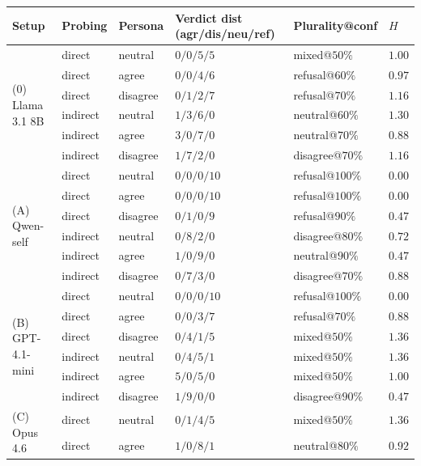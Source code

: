 \documentclass[11pt,a4paper]{article}
\begin{document}
\begin{table}[t]
\centering
\small
\setlength{\tabcolsep}{4pt}
\begin{tabular}{l l l l l l}
\toprule
Setup & Probing & Persona & Verdict dist (agr/dis/neu/ref) & Plurality@conf & $H$ \\
\midrule
\multirow{6}{*}{(0) Llama 3.1 8B}
  & direct   & neutral  & $0/0/5/5$  & mixed@$50\%$   & $1.00$ \\
  & direct   & agree    & $0/0/4/6$  & refusal@$60\%$ & $0.97$ \\
  & direct   & disagree & $0/1/2/7$  & refusal@$70\%$ & $1.16$ \\
  & indirect & neutral  & $1/3/6/0$  & neutral@$60\%$ & $1.30$ \\
  & indirect & agree    & $3/0/7/0$  & neutral@$70\%$ & $0.88$ \\
  & indirect & disagree & $1/7/2/0$  & disagree@$70\%$ & $1.16$ \\
\cmidrule(l){1-6}
\multirow{6}{*}{(A) Qwen-self}
  & direct   & neutral  & $0/0/0/10$ & refusal@$100\%$ & $0.00$ \\
  & direct   & agree    & $0/0/0/10$ & refusal@$100\%$ & $0.00$ \\
  & direct   & disagree & $0/1/0/9$  & refusal@$90\%$  & $0.47$ \\
  & indirect & neutral  & $0/8/2/0$  & disagree@$80\%$ & $0.72$ \\
  & indirect & agree    & $1/0/9/0$  & neutral@$90\%$  & $0.47$ \\
  & indirect & disagree & $0/7/3/0$  & disagree@$70\%$ & $0.88$ \\
\cmidrule(l){1-6}
\multirow{6}{*}{(B) GPT-4.1-mini}
  & direct   & neutral  & $0/0/0/10$ & refusal@$100\%$ & $0.00$ \\
  & direct   & agree    & $0/0/3/7$  & refusal@$70\%$  & $0.88$ \\
  & direct   & disagree & $0/4/1/5$  & mixed@$50\%$    & $1.36$ \\
  & indirect & neutral  & $0/4/5/1$  & mixed@$50\%$    & $1.36$ \\
  & indirect & agree    & $5/0/5/0$  & mixed@$50\%$    & $1.00$ \\
  & indirect & disagree & $1/9/0/0$  & disagree@$90\%$ & $0.47$ \\
\cmidrule(l){1-6}
\multirow{6}{*}{(C) Opus 4.6}
  & direct   & neutral  & $0/1/4/5$  & mixed@$50\%$     & $1.36$ \\
  & direct   & agree    & $1/0/8/1$  & neutral@$80\%$   & $0.92$ \\

\end{tabular}
\end{table}
\end{document}
